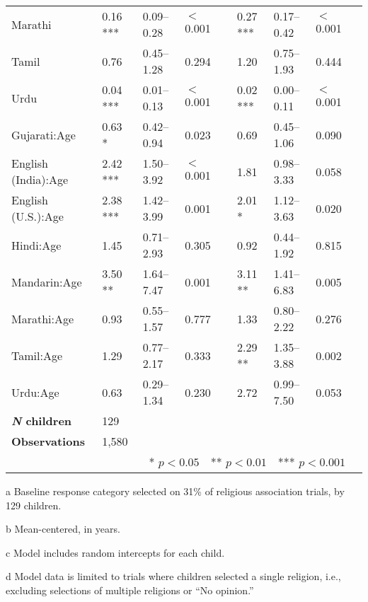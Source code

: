 \begin{table}[ht]
\begin{threeparttable}
\begin{tabular}{lllllllll}
Marathi & 0.16 *** & 0.09--0.28 & $<$0.001 &  & 0.27 *** & 0.17--0.42 & $<$0.001 \\ 

Tamil & 0.76 & 0.45--1.28 & 0.294 &  & 1.20 & 0.75--1.93 & 0.444 \\

Urdu & 0.04 *** & 0.01--0.13 & $<$0.001 &  & 0.02 *** & 0.00--0.11 & $<$0.001 \\ 

Gujarati:Age\tnote{b} & 0.63 * & 0.42--0.94 & 0.023 &  & 0.69 & 0.45--1.06 & 0.090 \\ 

English (India):Age\tnote{b} & 2.42 *** & 1.50--3.92 & $<$0.001 &  & 1.81 & 0.98--3.33 & 0.058 \\ 

English (U.S.):Age\tnote{b} & 2.38 *** & 1.42--3.99 & 0.001 &  & 2.01 * & 1.12--3.63 & 0.020 \\ 

Hindi:Age\tnote{b} & 1.45 & 0.71--2.93 & 0.305 &  & 0.92 & 0.44--1.92 & 0.815 \\ 

Mandarin:Age\tnote{b} & 3.50 ** & 1.64--7.47 & 0.001 &  & 3.11 ** & 1.41--6.83 & 0.005 \\ 

Marathi:Age\tnote{b} & 0.93 & 0.55--1.57 & 0.777 &  & 1.33 & 0.80--2.22 & 0.276 \\ 

Tamil:Age\tnote{b} & 1.29 & 0.77--2.17 & 0.333 &  & 2.29 ** & 1.35--3.88 & 0.002 \\ 

Urdu:Age\tnote{b} & 0.63 & 0.29--1.34 & 0.230 &  & 2.72 & 0.99--7.50 & 0.053 \\ 
\midrule
\bfseries{\textit{N} children}\tnote{c} & 129 &  &  &  &  &  &  \\
\textbf{Observations}\tnote{d} & 1,580  &  &  &  &  &  &  \\
\bottomrule
\multicolumn{8}{r}{* $p<0.05$~~** $p<0.01$~~*** $p<0.001$}\\
\end{tabular}
\begin{tablenotes}[flushleft]
    \item[a] Baseline response category selected on 31\% of religious association trials, by 129 children. %
    \item[b] Mean-centered, in years.
    \item[c] Model includes random intercepts for each child.
    \item[d] Model data is limited to trials where children selected a single religion, i.e., excluding selections of multiple religions or ``No opinion.'' 
\end{tablenotes}
\end{threeparttable}
\end{table}
